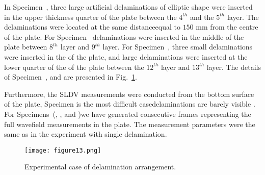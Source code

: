 In Specimen~, three large artificial delaminations \DIFdelbegin {}\DIFdelend of elliptic shape were inserted in the upper thickness quarter of the plate between the \(4^{th}\) and the \(5^{th}\) layer.
The delaminations were located at the same distance\DIFaddbegin \DIFadd{, }\DIFaddend equal to \(150\) mm from the centre of the plate.
For Specimen~ delaminations were inserted in the middle \DIFdelbegin {}\DIFdelend \DIFaddbegin {}\DIFaddend of the plate between \(8^{th}\) layer and \(9^{th}\) layer.
For Specimen~, three small delaminations were inserted in the \DIFdelbegin {}\DIFdelend \DIFaddbegin {}\DIFaddend of the plate, and \DIFdelbegin {}\DIFdelend \DIFaddbegin {}\DIFaddend large delaminations were inserted at the lower quarter of the \DIFdelbegin {}\DIFdelend \DIFaddbegin {}\DIFaddend of the plate between the \(12^{th}\) layer and \(13^{th}\) layer.
The details of Specimen~,  and  are presented in Fig.~\ref{fig:plate_delam_arrangment}.

Furthermore, the SLDV measurements were conducted from the bottom surface of the plate\DIFdelbegin {}\DIFdelend \DIFaddbegin {}\DIFaddend , Specimen  is the most difficult case\DIFdelbegin {}\DIFdelend \DIFaddbegin {}\DIFaddend delaminations are barely visible \DIFaddbegin {}\DIFaddend .
For Specimens~(, , and )\DIFaddbegin \DIFadd{,  }\DIFaddend we have generated \DIFdelbegin {}\DIFdelend \DIFaddbegin {}\DIFaddend consecutive frames representing the full wavefield measurements in the plate.
The measurement parameters were the same as in the experiment with \DIFaddbegin {}\DIFaddend single delamination.
\begin{figure}[!h]
	\centering
	\DIFdelbeginFL %
\DIFdelendFL \DIFaddbeginFL \texttt{[image: figure13.png]}
	\DIFaddendFL \caption{Experimental case of delamination arrangement.}
	\label{fig:plate_delam_arrangment}
\end{figure}

